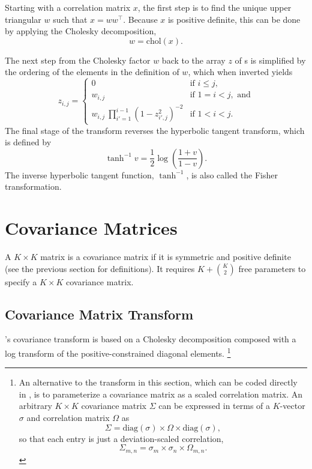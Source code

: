 Starting with a correlation matrix $x$, the first step is to find the
unique upper triangular $w$ such that $x = w w^{\top}$.  Because $x$
is positive definite, this can be done by applying the Cholesky
decomposition,
\[
w = \mbox{chol}(x).
\]


The next step from the Cholesky factor $w$ back to the array $z$ of
{\CPC}s is simplified by the ordering of the elements in the
definition of $w$, which when inverted yields
%
\[
z_{i,j} =
\left\{
\begin{array}{cl}
0 & \mbox{if } i \leq j,
\\[8pt]
w_{i,j} & \mbox{if } 1 = i < j, \mbox{ and}
\\[8pt]
{w_{i,j}}
\
\prod_{i'=1}^{i-1} \left( 1 - z_{i'\!,j}^2 \right)^{-2}
& \mbox{if } 1 < i < j.
\end{array}
\right.
\]
The final stage of the transform reverses the hyperbolic tangent
transform, which is defined by 
\[
\tanh^{-1} v = \frac{1}{2} \log \left( \frac{1 + v}{1 - v} \right).
\]
The inverse hyperbolic tangent function, $\tanh^{-1}$, is also called
the Fisher transformation.


\section{Covariance Matrices}

A $K \times K$ matrix is a covariance matrix if it is symmetric and
positive definite (see the previous section for definitions).  It
requires $K + {K \choose 2}$ free parameters to specify a $K \times K$
covariance matrix.


\subsection{Covariance Matrix Transform}

\Stan's covariance transform is based on a Cholesky decomposition
composed with a log transform of the positive-constrained diagonal
elements.%
%
\footnote{An alternative to the transform in this section, which can
  be coded directly in \Stan, is to parameterize a covariance matrix
  as a scaled correlation matrix.  An arbitrary $K \times K$
  covariance matrix $\Sigma$ can be expressed in terms of a $K$-vector
  $\sigma$ and correlation matrix $\Omega$ as
  \[
  \Sigma = \mbox{diag}(\sigma) \times \Omega \times \mbox{diag}(\sigma),
  \]
  so that each entry is just a deviation-scaled correlation,
  \[
  \Sigma_{m,n} = \sigma_m \times \sigma_n \times \Omega_{m,n}.
  \]
}

